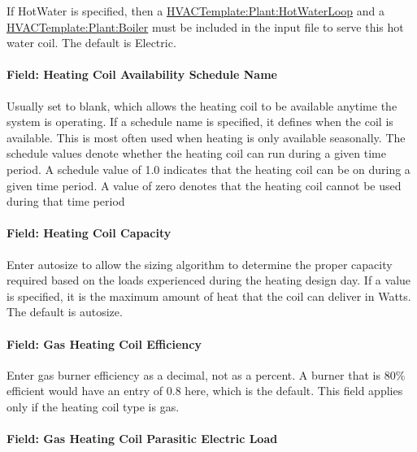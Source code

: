 If HotWater is specified, then a \hyperref[hvactemplateplanthotwaterloop]{HVACTemplate:Plant:HotWaterLoop} and a \hyperref[hvactemplateplantboiler]{HVACTemplate:Plant:Boiler} must be included in the input file to serve this hot water coil. The default is Electric.

\paragraph{Field: Heating Coil Availability Schedule Name}\label{field-heating-coil-availability-schedule-name-1}

Usually set to blank, which allows the heating coil to be available anytime the system is operating. If a schedule name is specified, it defines when the coil is available. This is most often used when heating is only available seasonally. The schedule values denote whether the heating coil can run during a given time period. A schedule value of 1.0 indicates that the heating coil can be on during a given time period. A value of zero denotes that the heating coil cannot be used during that time period

\paragraph{Field: Heating Coil Capacity}\label{field-heating-coil-capacity}

Enter autosize to allow the sizing algorithm to determine the proper capacity required based on the loads experienced during the heating design day. If a value is specified, it is the maximum amount of heat that the coil can deliver in Watts. The default is autosize.

\paragraph{Field: Gas Heating Coil Efficiency}\label{field-gas-heating-coil-efficiency}

Enter gas burner efficiency as a decimal, not as a percent. A burner that is 80\% efficient would have an entry of 0.8 here, which is the default. This field applies only if the heating coil type is gas.

\paragraph{Field: Gas Heating Coil Parasitic Electric Load}\label{field-gas-heating-coil-parasitic-electric-load}


